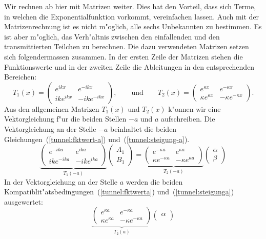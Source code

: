 \begin{refsection}
Wir rechnen ab hier mit Matrizen weiter. 
Dies hat den Vorteil, dass sich Terme, in welchen die Exponentialfunktion vorkommt, vereinfachen lassen. 
Auch mit der Matrizenrechnung ist es nicht m"oglich, alle sechs Unbekannten zu bestimmen. 
Es ist aber m"oglich, das Verh"altnis zwischen den einfallenden und den transmittierten Teilchen zu berechnen. 
Die dazu verwendeten Matrizen setzen sich folgendermassen zusammen.
In der ersten Zeile der Matrizen stehen die Funktionswerte und in der zweiten Zeile die Ableitungen in den entsprechenden Bereichen:
\[
T_1(x) =
\begin{pmatrix}
e^{ikx}
&
e^{-ikx}
\\
ike^{ikx}
&
-ike^{-ikx}
\end{pmatrix},
\qquad
\text{und}
\qquad
T_2(x) =
\begin{pmatrix}
e^{\kappa x}
&
e^{-\kappa x}
\\
\kappa e^{\kappa x}
&
-\kappa e^{-\kappa x}
\end{pmatrix}.
\]
Aus den allgemeinen Matrizen $T_1(x)$ und $T_2(x)$ k"onnen wir eine Vektorgleichung f"ur die beiden Stellen $-a$ und $a$ aufschreiben.
Die Vektorgleichung an der Stelle $-a$ beinhaltet die beiden Gleichungen~(\ref{tunnel:fktwert-a}) und~(\ref{tunnel:steigung-a}).
\[
\underbrace{
\begin{pmatrix}
e^{-ika}
&
e^{ika}
\\
ike^{-ika}
&
-ike^{ika}
\end{pmatrix}
}_{T_1(-a)}
\begin{pmatrix}
A_1
\\
B_1
\end{pmatrix}
 = 
\underbrace{
\begin{pmatrix}
e^{-\kappa a}
&
e^{\kappa a}
\\
\kappa e^{-\kappa a}
&
-\kappa e^{\kappa a}
\end{pmatrix}
}_{T_2(-a)}
\begin{pmatrix}
\alpha
\\
\beta
\end{pmatrix}
\]
In der Vektorgleichung an der Stelle $a$ werden die beiden Kompatiblit"atsbedingungen~(\ref{tunnel:fktwerta}) und~(\ref{tunnel:steigunga}) ausgewertet:
\[
\underbrace{
\begin{pmatrix}
e^{\kappa a}
&
e^{-\kappa a}
\\
\kappa e^{\kappa a}
&
-\kappa e^{-\kappa a}
\end{pmatrix}
}_{T_2(a)}
\begin{pmatrix}
\alpha
\\

\end{pmatrix}\]
\end{refsection}
